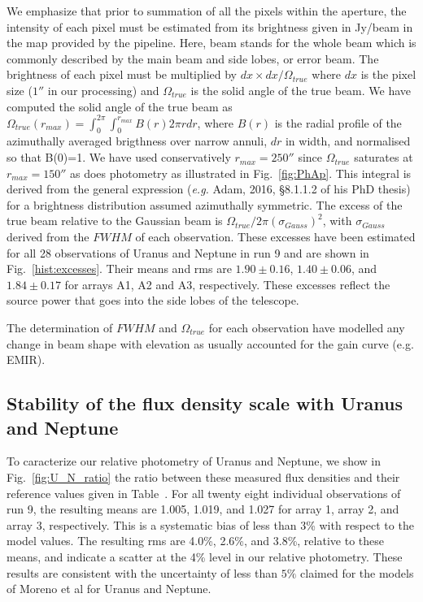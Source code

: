 We emphasize that prior to summation of all the pixels within the aperture, the intensity of each pixel must be estimated
from its brightness  given in Jy/beam in the map provided by the
pipeline. Here, beam stands  for the whole beam which is commonly 
described by the main beam and side lobes, or error beam. The brightness of each pixel must be multiplied by
$dx \times dx / \Omega_{true}$ where  $dx$ is the pixel size ($1''$ in our processing)
and $\Omega_{true}$  is the solid angle of the true beam.
We have computed the solid angle of the true beam as
$ \Omega_{true} (r_{max}) = \int_0^{2\pi} \int_0^{r_{max}} B(r) 2 \pi r dr$, where
$B(r)$ is the radial profile of the azimuthally averaged brigthness over narrow annuli,  $dr$ in width, and normalised so that B(0)=1.
We have used conservatively $r_{max}=250''$ since $ \Omega_{true}$  saturates at $r_{max}=150''$ as does photometry as illustrated
in Fig.~\ref{fig:PhAp}. This integral is derived from the general expression ({\it e.g.} Adam, 2016, \S 8.1.1.2 of his PhD thesis) for a
brightness distribution assumed azimuthally symmetric.  The excess
of the true beam relative to the Gaussian beam is $\Omega_{true} / 2 \pi (\sigma_{Gauss})^2$, with  $\sigma_{Gauss}$ derived from
the $FWHM$ of each observation. These excesses have been 
estimated  for all 28 observations of Uranus and Neptune in run 9 and are shown in Fig.~\ref{hist:excesses}.
Their means and rms   are $1.90 \pm 0.16 $, $ 1.40 \pm 0.06$, and $1.84\pm 0.17$ for arrays A1, A2 and A3, respectively. 
These excesses reflect the source power that goes into the side lobes of the telescope.

The determination of $FWHM$ and $\Omega_{true}$  for each observation
have modelled any change in beam shape with elevation as usually accounted for the gain curve (e.g. EMIR).





\subsection {Stability of the flux density scale with  Uranus and Neptune}

To caracterize our relative photometry of Uranus and Neptune, we show in Fig.~\ref{fig:U_N_ratio} the ratio between these measured flux densities
and their reference values given in Table~\label{tab:fluxPred}.
For all twenty eight individual observations of run 9, the resulting means are 1.005,  1.019, and 1.027
for array 1, array 2, and array 3, respectively. This is a systematic bias of less than 3\% with respect to the model values.
The resulting rms are 4.0\%, 2.6\%, and 3.8\%, relative to these means, and indicate
a scatter at the 4\% level in our relative photometry.  These results are consistent with the uncertainty of less than
$5\%$ claimed for the models of Moreno et al for Uranus and Neptune.

